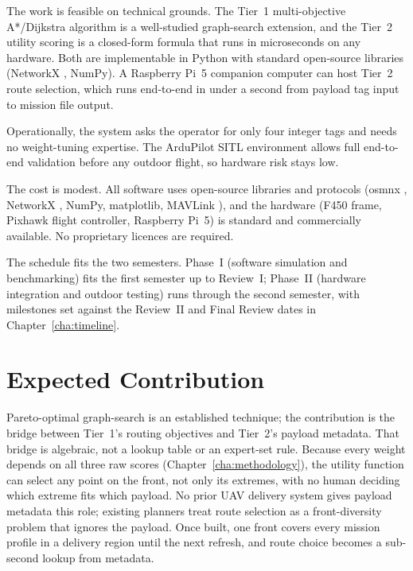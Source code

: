 \documentclass{ssnreview}
\newcommand{\flowchapter}[1]{\par\addvspace{30pt}{\let\clearpage\relax\chapter{#1}}}
\begin{document}
The work is feasible on technical grounds. The Tier~1 multi-objective A*/Dijkstra
algorithm is a well-studied graph-search extension, and the Tier~2 utility scoring is a
closed-form formula that runs in microseconds on any hardware. Both are implementable in
Python with standard open-source libraries (NetworkX \cite{r5}, NumPy). A Raspberry Pi~5
companion computer can host Tier~2 route selection, which runs end-to-end in under a
second from payload tag input to mission file output.

Operationally, the system asks the operator for only four integer tags and needs no
weight-tuning expertise. The ArduPilot SITL environment allows full end-to-end
validation before any outdoor flight, so hardware risk stays low.

The cost is modest. All software uses open-source libraries and protocols (osmnx
\cite{r4}, NetworkX \cite{r5}, NumPy, matplotlib, MAVLink \cite{r7}), and the hardware
(F450 frame, Pixhawk flight controller, Raspberry Pi~5) is standard and commercially
available. No proprietary licences are required.

The schedule fits the two semesters. Phase~I (software simulation and benchmarking) fits
the first semester up to Review~I; Phase~II (hardware integration and outdoor testing)
runs through the second semester, with milestones set against the Review~II and Final
Review dates in Chapter~\ref{cha:timeline}.

\section{Expected Contribution}

Pareto-optimal graph-search is an established technique; the contribution is the bridge
between Tier~1's routing objectives and Tier~2's payload metadata. That bridge is
algebraic, not a lookup table or an expert-set rule. Because every weight depends on all
three raw scores (Chapter~\ref{cha:methodology}), the utility function can select any
point on the front, not only its extremes, with no human deciding which extreme fits
which payload. No prior UAV delivery system gives payload metadata this role; existing
planners treat route selection as a front-diversity problem that ignores the payload.
Once built, one front covers every mission profile in a delivery region until the next
refresh, and route choice becomes a sub-second lookup from metadata.

\flowchapter{Methodology}\label{cha:methodology}
\end{document}
